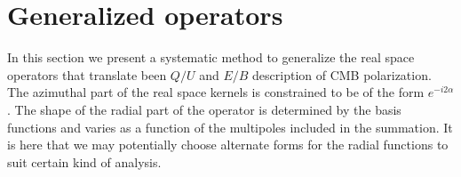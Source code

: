\section{Generalized operators}
In this section we present a systematic method to generalize the real space operators that translate been $Q/U$ and $E/B$ description of CMB polarization.
The azimuthal part of the real space kernels is constrained to be of the form $e^{-i2 \alpha}$. The shape of the radial part of the operator is determined by the basis functions and varies as a function of the multipoles included in the summation. It is here that we may potentially choose alternate forms for the radial functions to suit certain kind of analysis.

